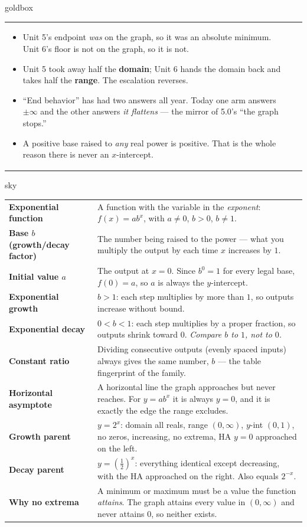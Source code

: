 \documentclass[10pt]{article}
\begin{document}
\begin{skillbox}{goldbox}
\begin{tabularx}{\linewidth}{@{}X|X@{}}
\begin{itemize}[leftmargin=1.1em, nosep, after=\vspace{2pt}]
  \item Unit 5's endpoint \emph{was} on the graph, so it was an absolute minimum. Unit 6's floor is not on the graph, so it is not.
  \item Unit 5 took away half the \textbf{domain}; Unit 6 hands the domain back and takes half the \textbf{range}. The escalation reverses.
  \item ``End behavior'' has had two answers all year. Today one arm answers $\pm\infty$ and the other answers \emph{it flattens} --- the mirror of 5.0's ``the graph stops.''
  \item A positive base raised to \emph{any} real power is positive. That is the whole reason there is never an $x$-intercept.
\end{itemize}
\end{tabularx}
\end{skillbox}

\begin{skillbox}{sky}
\renewcommand{\arraystretch}{1.3}
\begin{tabularx}{\linewidth}{@{}l X@{}}
\textbf{Exponential function} & A function with the variable in the \emph{exponent}: $f(x)=ab^{x}$, with $a\ne0$, $b>0$, $b\ne1$. \\
\textbf{Base $b$ (growth/decay factor)} & The number being raised to the power --- what you multiply the output by each time $x$ increases by $1$. \\
\textbf{Initial value $a$} & The output at $x=0$. Since $b^{0}=1$ for every legal base, $f(0)=a$, so $a$ is always the $y$-intercept. \\
\textbf{Exponential growth} & $b>1$: each step multiplies by more than $1$, so outputs increase without bound. \\
\textbf{Exponential decay} & $0<b<1$: each step multiplies by a proper fraction, so outputs shrink toward $0$. \emph{Compare $b$ to $1$, not to $0$.} \\
\textbf{Constant ratio} & Dividing consecutive outputs (evenly spaced inputs) always gives the same number, $b$ --- the table fingerprint of the family. \\
\textbf{Horizontal asymptote} & A horizontal line the graph approaches but never reaches. For $y=ab^{x}$ it is always $y=0$, and it is exactly the edge the range excludes. \\
\textbf{Growth parent} & $y=2^{x}$: domain all reals, range $(0,\infty)$, $y$-int $(0,1)$, no zeros, increasing, no extrema, HA $y=0$ approached on the left. \\
\textbf{Decay parent} & $y=\left(\frac12\right)^{x}$: everything identical except decreasing, with the HA approached on the right. Also equals $2^{-x}$. \\
\textbf{Why no extrema} & A minimum or maximum must be a value the function \emph{attains}. The graph attains every value in $(0,\infty)$ and never attains $0$, so neither exists. \\
\end{tabularx}
\end{skillbox}
\end{document}
